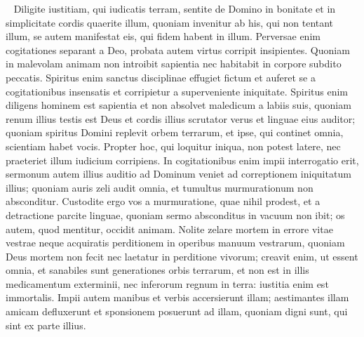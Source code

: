 
\begin{biblechapter}   
\verse Diligite iustitiam, qui iudicatis terram, sentite de Domino in bonitate et in simplicitate cordis quaerite illum, 
\verse quoniam invenitur ab his, qui non tentant illum, se autem manifestat eis, qui fidem habent in illum. 
\verse Perversae enim cogitationes separant a Deo, probata autem virtus corripit insipientes. 
\verse Quoniam in malevolam animam non introibit sapientia nec habitabit in corpore subdito peccatis. 
\verse Spiritus enim sanctus disciplinae effugiet fictum et auferet se a cogitationibus insensatis et corripietur a superveniente iniquitate. 
\verse Spiritus enim diligens hominem est sapientia et non absolvet maledicum a labiis suis, quoniam renum illius testis est Deus et cordis illius scrutator verus et linguae eius auditor; 
\verse quoniam spiritus Domini replevit orbem terrarum, et ipse, qui continet omnia, scientiam habet vocis. 
\verse Propter hoc, qui loquitur iniqua, non potest latere, nec praeteriet illum iudicium corripiens. 
\verse In cogitationibus enim impii interrogatio erit, sermonum autem illius auditio ad Dominum veniet ad correptionem iniquitatum illius; 
\verse quoniam auris zeli audit omnia, et tumultus murmurationum non absconditur. 
\verse Custodite ergo vos a murmuratione, quae nihil prodest, et a detractione parcite linguae, quoniam sermo absconditus in vacuum non ibit; os autem, quod mentitur, occidit animam. 
\verse Nolite zelare mortem in errore vitae vestrae neque acquiratis perditionem in operibus manuum vestrarum, 
\verse quoniam Deus mortem non fecit nec laetatur in perditione vivorum; 
\verse creavit enim, ut essent omnia, et sanabiles sunt generationes orbis terrarum, et non est in illis medicamentum exterminii, nec inferorum regnum in terra: 
\verse iustitia enim est immortalis. 
\verse Impii autem manibus et verbis accersierunt illam; aestimantes illam amicam defluxerunt et sponsionem posuerunt ad illam, quoniam digni sunt, qui sint ex parte illius. 
\end{biblechapter}

